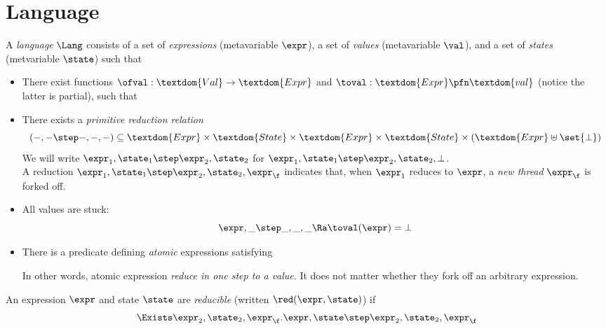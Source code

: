 \section{Language}

A \emph{language} $\Lang$ consists of a set  of \emph{expressions} (metavariable $\expr$), a set  of \emph{values} (metavariable $\val$), and a set  of \emph{states} (metvariable $\state$) such that
\begin{itemize}
\item There exist functions $\ofval : \textdom{Val} \to \textdom{Expr}$ and $\toval : \textdom{Expr} \pfn \textdom{val}$ (notice the latter is partial), such that
\item There exists a \emph{primitive reduction relation} \[(-,- \step -,-,-) \subseteq \textdom{Expr} \times \textdom{State} \times \textdom{Expr} \times \textdom{State} \times (\textdom{Expr} \uplus \set{\bot})\]
  We will write $\expr_1, \state_1 \step \expr_2, \state_2$ for $\expr_1, \state_1 \step \expr_2, \state_2, \bot$. \\
  A reduction $\expr_1, \state_1 \step \expr_2, \state_2, \expr_\f$ indicates that, when $\expr_1$ reduces to $\expr$, a \emph{new thread} $\expr_\f$ is forked off.
\item All values are stuck:
\[ \expr, \_ \step  \_, \_, \_ \Ra \toval(\expr) = \bot \]
\item There is a predicate defining \emph{atomic} expressions satisfying
\let\oldcr\cr
{}
In other words, atomic expression \emph{reduce in one step to a value}.
It does not matter whether they fork off an arbitrary expression.
\end{itemize}

\begin{defn}
  An expression $\expr$ and state $\state$ are \emph{reducible} (written $\red(\expr, \state)$) if
  \[ \Exists \expr_2, \state_2, \expr_\f. \expr,\state \step \expr_2,\state_2,\expr_\f \]
\end{defn}

